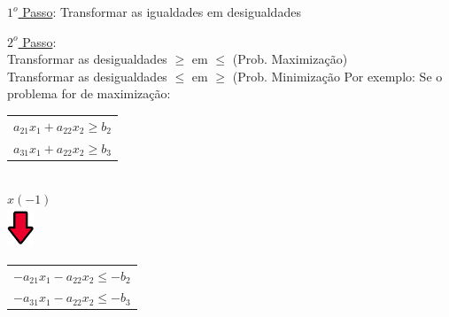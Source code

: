 \documentclass{beamer}
\begin{document}
\begin{frame}
{\begin{block}{{\color{yellow}\underline{$1^o$ Passo}:} Transformar as igualdades em desigualdades}
		\end{block}	
	}
	{
		\begin{block}{{\color{yellow}\underline{$2^o$ Passo}:} \\
				            Transformar as desigualdades $\ge$ em $\le$ (Prob. Maximização) \\
				            Transformar as desigualdades $\le$ em $\ge$ (Prob. Minimização }  
			Por exemplo: Se o problema for de maximização: \\
			\begin{table}
				\begin{tabular}{|c|}
					\hline
					\cellcolor{green!80} $a_{21}x_1 + a_{22}x_2 \ge b_2$ \\
					\cellcolor{green!80} $a_{31}x_1 + a_{22}x_2 \ge b_3$ \\
					\hline					
				\end{tabular} \\
				\vspace{0.3cm}
				{\color{red} $x (-1)$} \\
				\includegraphics[width=0.8cm,height=1.2cm]{setabaixo.png}  \\
				\vspace{0.3cm}
				\begin{tabular}{|c|}
					\hline
					\cellcolor{green!80} $-a_{21}x_1 - a_{22}x_2 \le -b_2$ \\
					\cellcolor{green!80} $-a_{31}x_1 - a_{22}x_2 \le -b_3$ \\					\hline					
				\end{tabular} \\
			\end{table}
			

\end{block}}
\end{frame}
\end{document}
